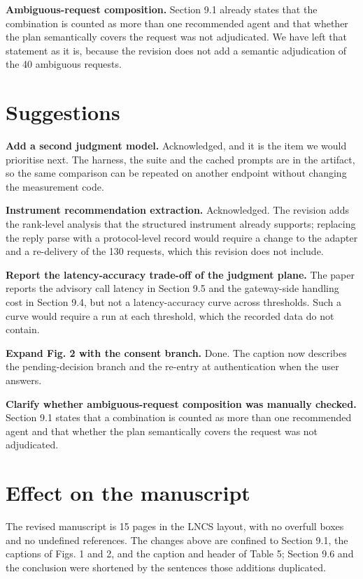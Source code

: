 \documentclass[11pt,a4paper]{article}
\begin{document}
\textbf{Ambiguous-request composition.} Section 9.1 already states that the combination is counted as more than one recommended agent and that whether the plan semantically covers the request was not adjudicated. We have left that statement as it is, because the revision does not add a semantic adjudication of the 40 ambiguous requests.

\section*{Suggestions}
\textbf{Add a second judgment model.} Acknowledged, and it is the item we would prioritise next. The harness, the suite and the cached prompts are in the artifact, so the same comparison can be repeated on another endpoint without changing the measurement code.

\textbf{Instrument recommendation extraction.} Acknowledged. The revision adds the rank-level analysis that the structured instrument already supports; replacing the reply parse with a protocol-level record would require a change to the adapter and a re-delivery of the 130 requests, which this revision does not include.

\textbf{Report the latency-accuracy trade-off of the judgment plane.} The paper reports the advisory call latency in Section 9.5 and the gateway-side handling cost in Section 9.4, but not a latency-accuracy curve across thresholds. Such a curve would require a run at each threshold, which the recorded data do not contain.

\textbf{Expand Fig. 2 with the consent branch.} Done. The caption now describes the pending-decision branch and the re-entry at authentication when the user answers.

\textbf{Clarify whether ambiguous-request composition was manually checked.} Section 9.1 states that a combination is counted as more than one recommended agent and that whether the plan semantically covers the request was not adjudicated.

\section*{Effect on the manuscript}
The revised manuscript is 15 pages in the LNCS layout, with no overfull boxes and no undefined references. The changes above are confined to Section 9.1, the captions of Figs. 1 and 2, and the caption and header of Table 5; Section 9.6 and the conclusion were shortened by the sentences those additions duplicated.
\end{document}
